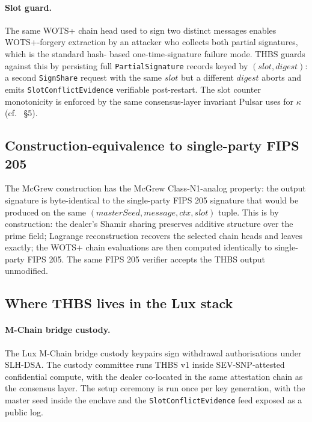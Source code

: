 \paragraph{Slot guard.} The same WOTS+ chain head used to sign two
distinct messages enables WOTS+-forgery extraction by an attacker
who collects both partial signatures, which is the standard hash-
based one-time-signature failure mode. THBS guards against this by
persisting full \texttt{PartialSignature} records keyed by
$(\mathit{slot}, \mathit{digest})$: a second
\texttt{SignShare} request with the same $\mathit{slot}$ but a
different $\mathit{digest}$ aborts and emits
\texttt{SlotConflictEvidence} verifiable post-restart. The slot
counter monotonicity is enforced by the same consensus-layer
invariant Pulsar uses for $\kappa$
(cf. \cite{lp073pulsarpaper}~\S5).

\subsection{Construction-equivalence to single-party FIPS 205}
\label{app:thbs:byteequal}

The McGrew construction has the McGrew Class-N1-analog property:
the output signature is byte-identical to the single-party FIPS
205 signature that would be produced on the same
$(\mathit{masterSeed}, \mathit{message}, \mathit{ctx},
\mathit{slot})$ tuple. This is by construction: the dealer's
Shamir sharing preserves additive structure over the prime field;
Lagrange reconstruction recovers the selected chain heads and
leaves exactly; the WOTS+ chain evaluations are then computed
identically to single-party FIPS 205. The same FIPS 205 verifier
accepts the THBS output unmodified.

\subsection{Where THBS lives in the Lux stack}
\label{app:thbs:where}

\paragraph{M-Chain bridge custody.} The Lux M-Chain bridge custody
keypairs sign withdrawal authorisations under SLH-DSA. The
custody committee runs THBS v1 inside SEV-SNP-attested confidential
compute, with the dealer co-located in the same attestation chain
as the consensus layer. The setup ceremony is run once per key
generation, with the master seed inside the enclave and the
\texttt{SlotConflictEvidence} feed exposed as a public log.

